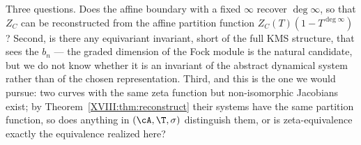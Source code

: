 Three questions. Does the affine boundary with a fixed $\infty$ recover $\deg\infty$, so that
$Z_C$ can be reconstructed from the affine partition function $Z_C(T)(1-T^{\deg\infty})$?
Second, is there any equivariant invariant, short of the full KMS structure, that sees the
$b_n$ --- the graded dimension of the Fock module is the natural candidate, but we do not know
whether it is an invariant of the abstract dynamical system rather than of the chosen
representation. Third, and this is the one we would pursue: two curves with the same zeta
function but non-isomorphic Jacobians exist; by Theorem~\ref{XVIII:thm:reconstruct} their systems
have the same partition function, so does anything in $(\cA,\T,\sigma)$ distinguish them, or
is zeta-equivalence exactly the equivalence realized here?

